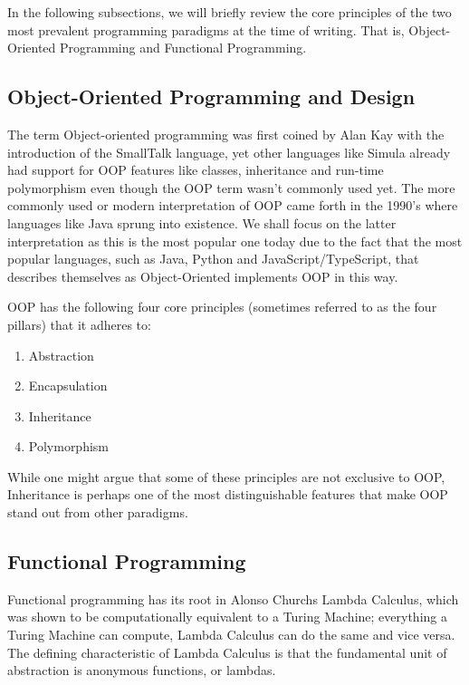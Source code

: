 In the following subsections, we will briefly review the core principles of the two most
prevalent programming paradigms at the time of writing. That is, Object-Oriented Programming
and Functional Programming.

\subsection{Object-Oriented Programming and Design}

The term Object-oriented programming was first coined by Alan Kay with the introduction of
the SmallTalk language, yet other languages like Simula already had support for OOP features
like classes, inheritance and run-time polymorphism even though the OOP term wasn't commonly
used yet. The more commonly used or modern interpretation of OOP came forth in the 1990's
where languages like Java sprung into existence. We shall focus on the latter interpretation
as this is the most popular one today due to the fact that the most popular languages,
such as Java, Python and JavaScript/TypeScript, that describes themselves as Object-Oriented
implements OOP in this way.

OOP has the following four core principles (sometimes referred to as the four pillars) that it adheres to:

\begin{enumerate}
\item Abstraction
\item Encapsulation
\item Inheritance
\item Polymorphism
\end{enumerate}

While one might argue that some of these principles are not exclusive to OOP, Inheritance is perhaps one of
the most distinguishable features that make OOP stand out from other paradigms.

\subsection{Functional Programming}

Functional programming has its root in Alonso Churchs Lambda Calculus, which was shown to
be computationally equivalent to a Turing Machine; everything a Turing Machine can compute, 
Lambda Calculus can do the same and vice versa. The defining characteristic of Lambda 
Calculus is that the fundamental unit of abstraction is anonymous functions, or lambdas. 

